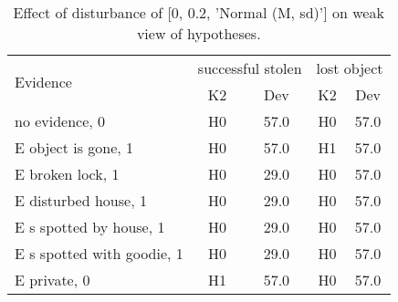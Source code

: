 \begin{table}\begin{tabular}{l|cc|cc}\toprule\multirow{2}{*}{Evidence} & \multicolumn{2}{c}{successful stolen}& \multicolumn{2}{c}{lost object}\\& {K2} & {Dev}& {K2} & {Dev}\\\midrule
no evidence, 0 & \cellcolor{Bittersweet}H0&\cellcolor{Bittersweet}57.0&\cellcolor{Bittersweet}H0&\cellcolor{Bittersweet}57.0\\E object is gone, 1 & \cellcolor{Bittersweet}H0&\cellcolor{Bittersweet}57.0&\cellcolor{Bittersweet}H1&\cellcolor{Bittersweet}57.0\\E broken lock, 1 & \cellcolor{Bittersweet}H0&\cellcolor{Bittersweet}29.0&\cellcolor{Bittersweet}H0&\cellcolor{Bittersweet}57.0\\E disturbed house, 1 & \cellcolor{Bittersweet}H0&\cellcolor{Bittersweet}29.0&\cellcolor{Bittersweet}H0&\cellcolor{Bittersweet}57.0\\E s spotted by house, 1 & \cellcolor{Bittersweet}H0&\cellcolor{Bittersweet}29.0&\cellcolor{Bittersweet}H0&\cellcolor{Bittersweet}57.0\\E s spotted with goodie, 1 & \cellcolor{Bittersweet}H0&\cellcolor{Bittersweet}29.0&\cellcolor{Bittersweet}H0&\cellcolor{Bittersweet}57.0\\E private, 0 & \cellcolor{Bittersweet}H1&\cellcolor{Bittersweet}57.0&\cellcolor{Bittersweet}H0&\cellcolor{Bittersweet}57.0\\\bottomrule\end{tabular}\caption{Effect of disturbance of [0, 0.2, 'Normal (M, sd)'] on weak view of hypotheses.}\end{table}
